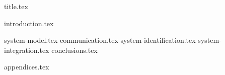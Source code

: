 \documentclass[final]{scrreprt} %
\begin{document}

{title.tex}

\newpage
{introduction.tex}
\tableofcontents

\newpage
{}
{system-model.tex}
{communication.tex}
{system-identification.tex}
{system-integration.tex}
{conclusions.tex}
\newpage
{}

\printbibliography
{appendices.tex}
\end{document}
